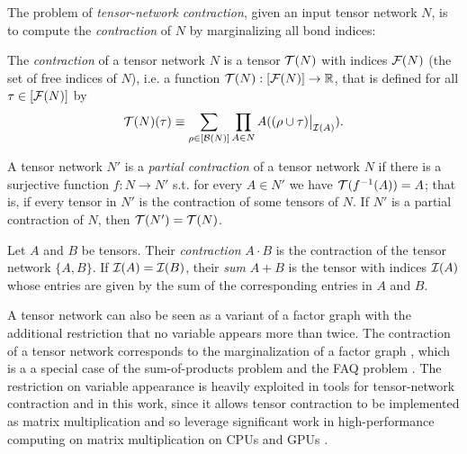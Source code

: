 The problem of \emph{tensor-network contraction}, given an input tensor network $N$, is to compute the \emph{contraction} of $N$ by marginalizing all bond indices:
\begin{definition}
The \emph{contraction} of a tensor network $N$ is a tensor $\mathcal{T}(N)$ with indices $\mathcal{F}(N)$ (the set of free indices of $N$), i.e. a function $\mathcal{T}(N) : [\mathcal{F}(N)] \rightarrow \mathbb{R}$, that is defined for all $\tau \in [\mathcal{F}(N)]$ by
		\begin{equation}
        \label{eqn:contraction} 
        \mathcal{T}(N)(\tau) \equiv \sum_{\rho \in [\mathcal{B}(N)]} \prod_{A \in N} A((\rho \cup \tau)\big|_{\mathcal{I}(A)}).
        \end{equation}
\end{definition}

A tensor network $N'$ is a \emph{partial contraction} of a tensor network $N$ if there is a surjective function $f: N \rightarrow N'$ s.t. for every $A \in N'$ we have $\mathcal{T}(f^{-1}(A)) = A$; that is, if every tensor in $N'$ is the contraction of some tensors of $N$. If $N'$ is a partial contraction of $N$, then $\mathcal{T}(N') = \mathcal{T}(N)$.

 Let $A$ and $B$ be tensors. Their \emph{contraction} $A \cdot B$ is the contraction of the tensor network $\{A, B\}$. If $\mathcal{I}(A) = \mathcal{I}(B)$, their \emph{sum} $A+B$ is the tensor with indices $\mathcal{I}(A)$ whose entries are given by the sum of the corresponding entries in $A$ and $B$. 


A tensor network can also be seen as a variant of a factor graph \cite{KFL01} with the additional restriction that no variable appears more than twice. The contraction of a tensor network corresponds to the marginalization of a factor graph \cite{RS17}, which is a a special case of the sum-of-products problem \cite{BDP09,dechter99} and the FAQ problem \cite{KNR16}. The restriction on variable appearance is heavily exploited in tools for tensor-network contraction and in this work, since it allows tensor contraction to be implemented as matrix multiplication and so leverage significant work in high-performance computing on matrix multiplication on CPUs \cite{LHKK77} and GPUs \cite{FSH04}.